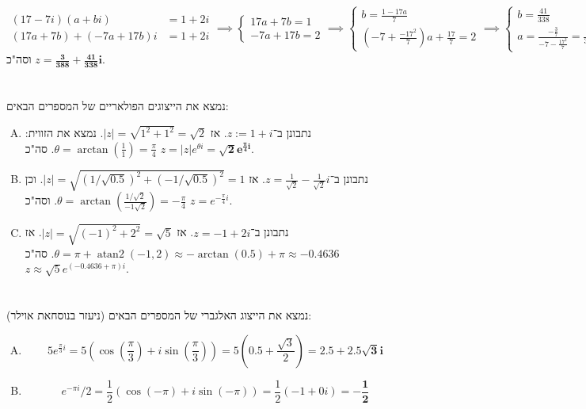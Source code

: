 \documentclass[]{article}
\DeclareMathOperator{\atant}  {atan2}
\newcommand\tg        {\theta}
\newcommand\cl [1]    {\left ( #1 \right )}
\theoremstyle{definition}
\newcommand\unquad           {\!\!\!\!}
\begin{document}
\begin{enumerate}[(A)]
\[\begin{aligned}
			(17 - 7i)(a + bi) &= 1 + 2i \\
			(17a + 7b) + (-7a + 17b)i &= 1 + 2i
		\end{aligned} \implies \begin{cases}
			17a + 7b = 1 \\
			-7a + 17b = 2
		\end{cases} \unquad\!\!\implies \begin{cases}
			b = \frac{1 - 17a}{7} \\
			(-7 + \frac{-17^2}{7})a + \frac{17}{7} = 2
		\end{cases} \unquad\!\!\implies \begin{cases}
			b = \frac{41}{338} \\
			a = \frac{-\frac{3}{7} }{-7 -\frac{17^2}{7}} = \frac{3}{388}
		\end{cases}\]
		וסה"כ $z = \bm{\frac{3}{388} + \frac{41}{338}i}$. 
	\end{enumerate}
	\section{}
	נמצא את הייצוגים הפולאריים של המספרים הבאים: 
	\begin{enumerate}[(A)]
		\item נתבונן ב־$z := 1 + i$. אז $|z| = \sqrt{1^2 + 1^2} = \sqrt 2$. נמצא את הזווית: $\tg = \arctan\cl{\frac{1}{1}} = \frac{\pi}{4}$. סה"כ $z = |z|e^{\tg i} = \bm{\sqrt 2 e^{\frac{\pi}{4}i}}$. 
		\item נתבונן ב־$z = \frac{1}{\sqrt 2} - \frac{1}{\sqrt 2}i$. אז $|z| = \sqrt{(1/\sqrt{0.5})^{2} + (-1/\sqrt{0.5})^2} = 1$. וכן $\tg = \arctan\cl{\frac{1/\sqrt2}{-1\sqrt 2}} = - \frac{\pi}{4}$. וסה"כ $z = e^{-\frac{\pi}{4}i}$. 
		\item נתבונן ב־$z = -1 + 2i$. אז $|z| = \sqrt{(-1)^2 + 2^2} = \sqrt{5}$. אז $\tg = \pi + \atant\cl{-1, 2} \approx -\arctan(0.5) + \pi \approx -0.4636$. סה"כ $z \approx \sqrt 5 e^{(-0.4636 + \pi)i}$. 
	\end{enumerate}
	\section{}
	נמצא את הייצוג האלגברי של המספרים הבאים (ניעזר בנוסחאת אוילר): 
	\begin{enumerate}[(A)]
		\item 
		\[ 5e^{\frac{\pi}{3}i} = 5\cl{\cos\cl{\frac{\pi}{3}} + i\sin\cl{\frac{\pi}{3}}} = 5\cl{0.5 + \frac{\sqrt 3}{2}} = \bm{2.5 + 2.5\sqrt 3 i} \]
		\item 
		\[ e^{-\pi i}/ 2 = \frac{1}{2}\cl{\cos\cl{-\pi} + i \sin\cl{-\pi}} = \frac{1}{2}(-1 + 0i) = \bm{-\frac{1}{2}} \]
	\end{enumerate}
\end{document}
